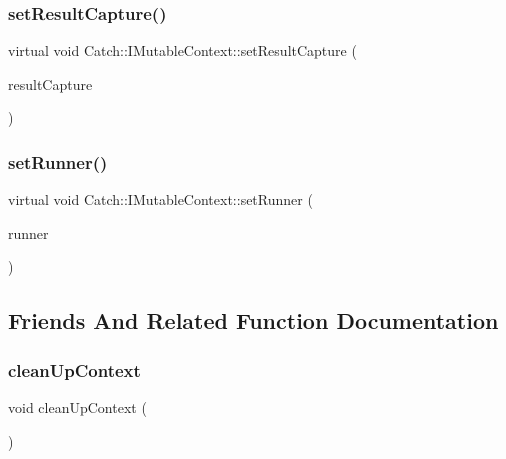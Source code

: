 \subsubsection{\texorpdfstring{set\+Result\+Capture()}{setResultCapture()}}
{\footnotesize\ttfamily virtual void Catch\+::\+I\+Mutable\+Context\+::set\+Result\+Capture (\begin{DoxyParamCaption}\item[{\mbox{\hyperlink{struct_catch_1_1_i_result_capture}{I\+Result\+Capture}} $\ast$}]{result\+Capture }\end{DoxyParamCaption})\hspace{0.3cm}{\ttfamily [pure virtual]}}

\mbox{\label{struct_catch_1_1_i_mutable_context_af2e53b1dea4527a2587cff266a730f6e}} 
\subsubsection{\texorpdfstring{set\+Runner()}{setRunner()}}
{\footnotesize\ttfamily virtual void Catch\+::\+I\+Mutable\+Context\+::set\+Runner (\begin{DoxyParamCaption}\item[{\mbox{\hyperlink{struct_catch_1_1_i_runner}{I\+Runner}} $\ast$}]{runner }\end{DoxyParamCaption})\hspace{0.3cm}{\ttfamily [pure virtual]}}



\subsection{Friends And Related Function Documentation}
\mbox{\label{struct_catch_1_1_i_mutable_context_ac07cdb7d744cc8f09672d924324b55fd}} 
\subsubsection{\texorpdfstring{clean\+Up\+Context}{cleanUpContext}}
{\footnotesize\ttfamily void clean\+Up\+Context (\begin{DoxyParamCaption}{ }\end{DoxyParamCaption})\hspace{0.3cm}{\ttfamily [friend]}}

